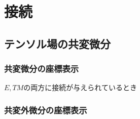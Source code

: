 \documentclass[report]{jlreq}
\begin{document}
\tableofcontents
\markboth{\contentsname}{}

%
\newpage
\setcounter{chapter}{1}
\chapter{接続}

%
\setcounter{section}{9}
\section{テンソル場の共変微分}

\subsection{共変微分の座標表示}

\begin{example}
\end{example}

\begin{example}
\end{example}

\begin{example}
\end{example}

\begin{example}
\end{example}

\begin{example}
    $E, TM$の両方に接続が与えられているとき
\end{example}

\subsection{共変外微分の座標表示}

\begin{example}[$E$に値をもつ$p$形式]
\end{example}

\begin{example}[曲率]
    \TODO{}
\end{example}
\end{document}
